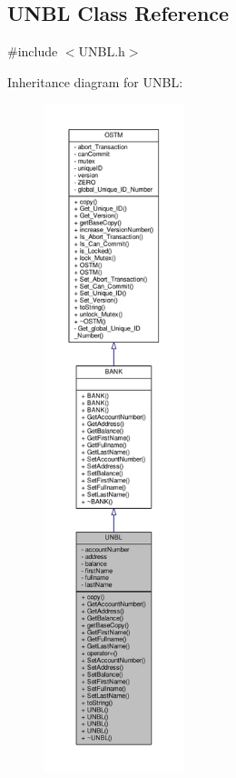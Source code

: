 \hypertarget{class_u_n_b_l}{}\subsection{U\+N\+BL Class Reference}
\label{class_u_n_b_l}


{\ttfamily \#include $<$U\+N\+B\+L.\+h$>$}



Inheritance diagram for U\+N\+BL\+:\nopagebreak
\begin{figure}[H]
\begin{center}
\leavevmode
\includegraphics[height=550pt]{class_u_n_b_l__inherit__graph}
\end{center}
\end{figure}


